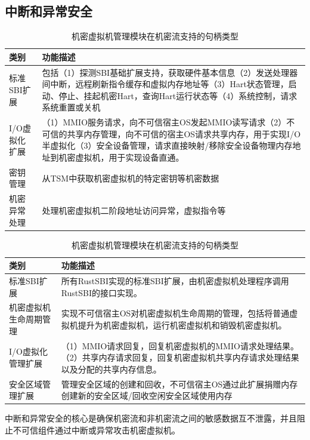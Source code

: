 \documentclass[master, vlined, review]{DissertUESTC}
\begin{document}
	\subsection{中断和异常安全}\label{机密虚拟机管理模块_exception_sec}
	\begin{table}[!ht]
		\caption{机密虚拟机管理模块在机密流支持的句柄类型}
		\label{tab:confidential-flow}
		\begin{tabular}{p{4cm} <{\centering} p{9cm}<{\centering}}
			\toprule
			类别 & 功能描述 \\
			
			\midrule
			标准SBI扩展 & 包括（1）探测SBI基础扩展支持，获取硬件基本信息（2）发送处理器间中断，远程刷新指令缓存和虚拟内存地址等（3）Hart状态管理，启动、停止、挂起机密Hart，查询Hart运行状态等（4）系统控制，请求系统重置或关机 \\

			\midrule
			I/O虚拟化扩展 & （1）MMIO服务请求，向不可信宿主OS发起MMIO读写请求（2）不可信的共享内存管理，向不可信的宿主OS请求共享内存，用于实现I/O半虚拟化（3）安全设备管理，请求直接映射/移除安全设备物理内存地址到机密虚拟机，用于实现设备直通。 \\
			
			\midrule
			密钥管理 & 从TSM中获取机密虚拟机的特定密钥等机密数据 \\
			
			\midrule
			机密异常处理 & 处理机密虚拟机二阶段地址访问异常，虚拟指令等 \\
			\bottomrule
		\end{tabular}
	\end{table}
	\begin{table}[!ht]
		\caption{机密虚拟机管理模块在机密流支持的句柄类型}
		\label{tab:non-confidential-flow}
		\begin{tabular}{p{4cm} <{\centering} p{9cm}<{\centering}}
			\toprule
			类别 & 功能描述 \\
			\midrule
			标准SBI扩展 & 所有RustSBI实现的标准SBI扩展，由机密虚拟机处理程序调用RustSBI的接口实现。 \\

			\midrule
			机密虚拟机生命周期管理 & 实现不可信宿主OS对机密虚拟机生命周期的管理，包括将普通虚拟机提升为机密虚拟机，运行机密虚拟机和销毁机密虚拟机。 \\
			
			\midrule
			I/O虚拟化管理扩展 & （1）MMIO请求回复，回复机密虚拟机的MMIO请求处理结果。（2）共享内存请求回复，回复机密虚拟机共享内存请求处理结果以及分配的共享内存信息。\\
			
			\midrule
			安全区域管理扩展 & 管理安全区域的创建和回收，不可信宿主OS通过此扩展捐赠内存创建新的安全区域/回收空闲安全区域使用内存 \\

			\bottomrule
		\end{tabular}
	\end{table}
	中断和异常安全的核心是确保机密流和非机密流之间的敏感数据互不泄露，并且阻止不可信组件通过中断或异常攻击机密虚拟机。
	
\end{document}
